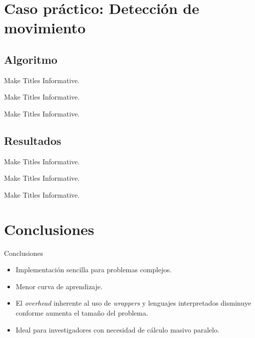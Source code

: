 \documentclass{beamer}
\begin{document}
\section{Caso práctico: Detección de movimiento}

\subsection{Algoritmo}

\begin{frame}{Make Titles Informative.}
\end{frame}

\begin{frame}{Make Titles Informative.}
\end{frame}

\begin{frame}{Make Titles Informative.}
\end{frame}


\subsection{Resultados}

\begin{frame}{Make Titles Informative.}
\end{frame}

\begin{frame}{Make Titles Informative.}
\end{frame}

\begin{frame}{Make Titles Informative.}
\end{frame}


\section{Conclusiones}

\begin{frame}{Conclusiones}
  \begin{itemize}
    \item Implementación sencilla para problemas complejos.
    \item Menor curva de aprendizaje.
    \item El \emph{overhead} inherente al uso de \emph{wrappers} y lenguajes interpretados disminuye conforme aumenta el tamaño del problema.
    \item Ideal para investigadores con necesidad de cálculo masivo paralelo.
  \end{itemize}
\end{frame}
\end{document}
